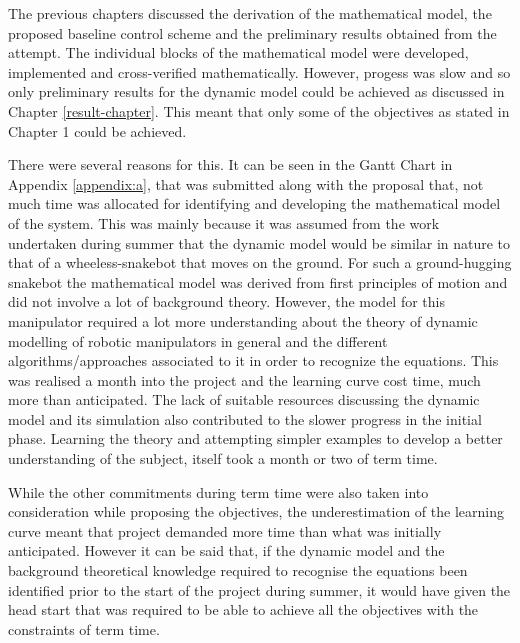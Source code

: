 \documentclass[a4paper,12pt]{report}
\begin{document}
The previous chapters discussed the derivation of the mathematical model, the proposed baseline control scheme and the preliminary results obtained from the attempt. The individual blocks of the mathematical model were developed, implemented and cross-verified mathematically. However, progess was slow and so only preliminary results for the dynamic model could be achieved as discussed in Chapter \ref{result-chapter}. This meant that only some of the objectives as stated in Chapter 1 could be achieved.

There were several reasons for this. It can be seen in the Gantt Chart in Appendix \ref{appendix:a}, that was submitted along with the proposal that, not much time was allocated for identifying and developing the mathematical model of the system. This was mainly because it was assumed from the work undertaken during summer that the dynamic model would be similar in nature to that of a wheeless-snakebot that moves on the ground. For such a ground-hugging snakebot the mathematical model was derived from first principles of motion and did not involve a lot of background theory. However, the model for this manipulator required a lot more understanding about the theory of dynamic modelling of robotic manipulators in general and the different algorithms/approaches associated to it in order to recognize the equations. This was realised a month into the project and the learning curve cost time, much more than anticipated. The lack of suitable resources discussing the dynamic model and its simulation also contributed to the slower progress in the initial phase. Learning the theory and attempting simpler examples to develop a better understanding of the subject, itself took a month or two of term time.

While the other commitments during term time were also taken into consideration while proposing the objectives, the underestimation of the learning curve meant that project demanded more time than what was initially anticipated. However it can be said that, if the dynamic model and the background theoretical knowledge required to recognise the equations been identified prior to the start of the project during summer, it would have given the head start that was required to be able to achieve all the objectives with the constraints of term time.
\end{document}

